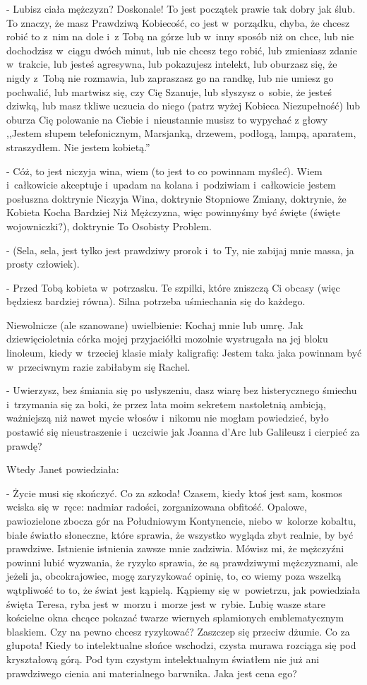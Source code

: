 \documentclass[oneside,polish,12pt,sfheadings]{mwbk}
\begin{document}
- Lubisz ciała mężczyzn? Doskonale! To jest początek prawie tak dobry
jak ślub. To znaczy, że masz Prawdziwą Kobiecość, co jest w~porządku,
chyba, że chcesz robić to z~nim na dole i~z Tobą na górze lub w~inny
sposób niż on chce, lub nie dochodzisz w~ciągu dwóch minut, lub nie
chcesz tego robić, lub zmieniasz zdanie w~trakcie, lub jesteś agresywna,
lub pokazujesz intelekt, lub oburzasz się, że nigdy z~Tobą nie rozmawia,
lub zapraszasz go na randkę, lub nie umiesz go pochwalić, lub martwisz
się, czy Cię Szanuje, lub słyszysz o~sobie, że jesteś dziwką, lub
masz tkliwe uczucia do niego (patrz wyżej Kobieca Niezupełność)
lub oburza Cię polowanie na Ciebie i~nieustannie musisz to wypychać
z głowy ,,Jestem słupem telefonicznym, Marsjanką, drzewem, podłogą,
lampą, aparatem, straszydłem. Nie jestem kobietą.''

- Cóż, to jest niczyja wina, wiem (to jest to co powinnam myśleć).
Wiem i~całkowicie akceptuje i~upadam na kolana i~podziwiam i~całkowicie
jestem posłuszna doktrynie Niczyja Wina, doktrynie Stopniowe Zmiany,
doktrynie, że Kobieta Kocha Bardziej Niż Mężczyzna, więc powinnyśmy
być święte (święte wojowniczki?), doktrynie To Osobisty Problem.

- (Sela, sela, jest tylko jest prawdziwy prorok i~to Ty, nie zabijaj
mnie massa, ja prosty człowiek).

- Przed Tobą kobieta w~potrzasku. Te szpilki, które zniszczą Ci obcasy
(więc będziesz bardziej równa). Silna potrzeba uśmiechania się do
każdego.

Niewolnicze (ale szanowane) uwielbienie: Kochaj mnie lub umrę. Jak
dziewięcioletnia córka mojej przyjaciółki mozolnie wystrugała na jej
bloku linoleum, kiedy w~trzeciej klasie miały kaligrafię: Jestem taka
jaka powinnam być w~przeciwnym razie zabiłabym się Rachel.

- Uwierzysz, bez śmiania się po usłyszeniu, dasz wiarę bez histerycznego
śmiechu i~trzymania się za boki, że przez lata moim sekretem nastoletnią
ambicją, ważniejszą niż nawet mycie włosów i~nikomu nie mogłam powiedzieć,
było postawić się nieustraszenie i~uczciwie jak Joanna d'Arc lub Galileusz
i cierpieć za prawdę?

Wtedy Janet powiedziała: 

- Życie musi się skończyć. Co za szkoda!
Czasem, kiedy ktoś jest sam, kosmos wciska się w~ręce: nadmiar radości,
zorganizowana obfitość. Opalowe, pawiozielone zbocza gór na Południowym
Kontynencie, niebo w~kolorze kobaltu, białe światło słoneczne, które
sprawia, że wszystko wygląda zbyt realnie, by być prawdziwe. Istnienie
istnienia zawsze mnie zadziwia. Mówisz mi, że mężczyźni powinni lubić
wyzwania, że ryzyko sprawia, że są prawdziwymi mężczyznami, ale jeżeli
ja, obcokrajowiec, mogę zaryzykować opinię, to, co wiemy poza wszelką
wątpliwość to to, że świat jest kąpielą. Kąpiemy się w~powietrzu,
jak powiedziała święta Teresa, ryba jest w~morzu i~morze jest w~rybie.
Lubię wasze stare kościelne okna chcące pokazać twarze wiernych splamionych
emblematycznym blaskiem. Czy na pewno chcesz ryzykować? Zaszczep się
przeciw dżumie. Co za głupota! Kiedy to intelektualne słońce wschodzi,
czysta murawa rozciąga się pod kryształową górą. Pod tym czystym
intelektualnym światłem nie już ani prawdziwego cienia ani materialnego
barwnika. Jaka jest cena ego?
\end{document}
